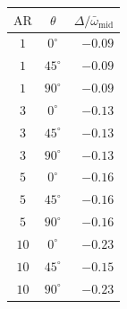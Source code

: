 \begin{tabularx}{\textwidth}{@{}c c r@{}}
\toprule
$\mathrm{AR}$ & $\theta$ & $\Delta/\bar{\omega}_{\mathrm{mid}}$ \\
\midrule
$1$ & $0^\circ$  & $-0.09$ \\
$1$ & $45^\circ$ & $-0.09$ \\
$1$ & $90^\circ$ & $-0.09$ \\
$3$ & $0^\circ$  & $-0.13$ \\
$3$ & $45^\circ$ & $-0.13$ \\
$3$ & $90^\circ$ & $-0.13$ \\
$5$ & $0^\circ$  & $-0.16$ \\
$5$ & $45^\circ$ & $-0.16$ \\
$5$ & $90^\circ$ & $-0.16$ \\
$10$ & $0^\circ$  & $-0.23$ \\
$10$ & $45^\circ$ & $-0.15$ \\
$10$ & $90^\circ$ & $-0.23$ \\
\bottomrule
\end{tabularx}
